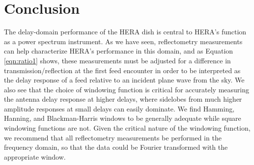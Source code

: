 \documentclass[twocolumn]{emulateapj}
\begin{document}



\section{\textbf{Conclusion}}

The delay-domain performance of the HERA dish is central to HERA's function as a power spectrum instrument.
As we have seen, reflectometry measurements can help characterize HERA's performance in this domain, and
as Equation \ref{eqn:ratio1} shows, these measurements must be adjusted for a difference in transmission/reflection
at the first feed encounter in order to be interpreted as the delay response of a feed relative to an incident
plane wave from the sky.  We also see that the choice of windowing function is critical for accurately measuring the
antenna delay response at higher delays, where sidelobes from much higher amplitude responses at small delays can easily
dominate.  We find Hamming, Hanning, and Blackman-Harris windows to be generally adequate while square windowing functions are not.
Given the critical nature of the windowing function, we recommend that all reflectometry measurements be performed in the
frequency domain, so that the data could be Fourier transformed with the appropriate window.
\end{document}

